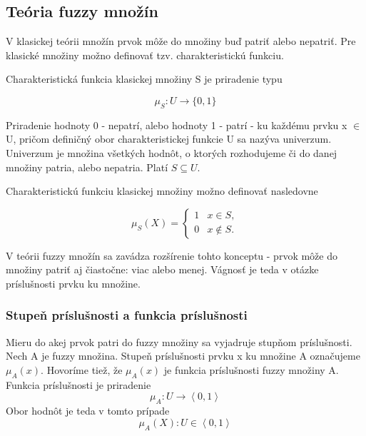 \subsection{Teória fuzzy množín}

V klasickej teórii množín prvok môže do množiny buď patriť alebo nepatriť. Pre klasické množiny možno definovať tzv. charakteristickú funkciu. 

Charakteristická funkcia klasickej množiny S je priradenie typu \cite{gregorUI} 

\begin{equation}\label{charfunkcia}
\mu_S : U \longrightarrow \{0, 1\}
\end{equation}

Priradenie hodnoty 0 - nepatrí, alebo hodnoty 1 - patrí - ku každému prvku x $\in$ U, pričom definičný obor charakteristickej funkcie U sa nazýva univerzum. Univerzum je množina všetkých hodnôt, o ktorých rozhodujeme či do danej množiny patria, alebo nepatria. Platí $S \subseteq U$. \cite{gregorUI} 

Charakteristickú funkciu klasickej množiny možno definovať nasledovne \cite{gregorUI, gregorRef14} 

\begin{equation}\label{charfunkciafuzzy}
\mu_S (X) = 
\begin{cases}
1 &  x \in S, \\
0 &  x \notin S.
\end{cases}
\end{equation}

V teórii fuzzy množín sa zavádza rozšírenie tohto konceptu - prvok môže do množiny patriť aj čiastočne: viac alebo menej. Vágnosť je teda v otázke príslušnosti prvku ku množine. \cite{gregorUI} 

\subsubsection{Stupeň príslušnosti a funkcia príslušnosti}
Mieru do akej prvok patri do fuzzy množiny sa vyjadruje stupňom príslušnosti. Nech A je fuzzy množina. Stupeň príslušnosti prvku x ku množine A označujeme $\mu_A\left( x\right) $. 
Hovoríme tiež, že $\mu_A\left( x\right) $ je funkcia príslušnosti fuzzy množiny A. \cite{gregorUI, gregorRef14} 
Funkcia príslušnosti je priradenie
\begin{equation}\label{funPrislus}
\mu_A : U \longrightarrow \left\langle 0, 1 \right\rangle 
\end{equation}
Obor hodnôt je teda v tomto prípade 
\begin{equation}\label{funPrislus}
\mu_A (X) : U \in \left\langle 0, 1 \right\rangle 
\end{equation}

